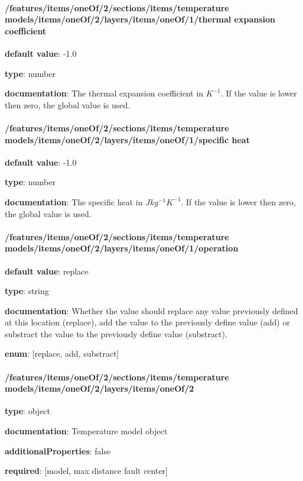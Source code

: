 \begin{itemized}
\end{itemized}\paragraph{/features/items/oneOf/2/sections/items/temperature models/items/oneOf/2/layers/items/oneOf/1/thermal expansion coefficient} \begin{itemized}
\item {\bf default value}: -1.0
\item {\bf type}: number
\item {\bf documentation}: The thermal expansion coefficient in $K^{-1}$. If the value is lower then zero, the global value is used.
\end{itemized}\paragraph{/features/items/oneOf/2/sections/items/temperature models/items/oneOf/2/layers/items/oneOf/1/specific heat} \begin{itemized}
\item {\bf default value}: -1.0
\item {\bf type}: number
\item {\bf documentation}: The specific heat in $J kg^{-1} K^{-1}$. If the value is lower then zero, the global value is used.
\end{itemized}\paragraph{/features/items/oneOf/2/sections/items/temperature models/items/oneOf/2/layers/items/oneOf/1/operation} \begin{itemized}
\item {\bf default value}: replace
\item {\bf type}: string
\item {\bf documentation}: Whether the value should replace any value previously defined at this location (replace), add the value to the previously define value (add) or substract the value to the previously define value (substract).
\item {\bf enum}: [replace, add, substract]\end{itemized}\paragraph{/features/items/oneOf/2/sections/items/temperature models/items/oneOf/2/layers/items/oneOf/2} \begin{itemized}
\item {\bf type}: object
\item {\bf documentation}: Temperature model object
\item {\bf additionalProperties}: false
\item {\bf required}: [model, max distance fault center]\end{itemized}
